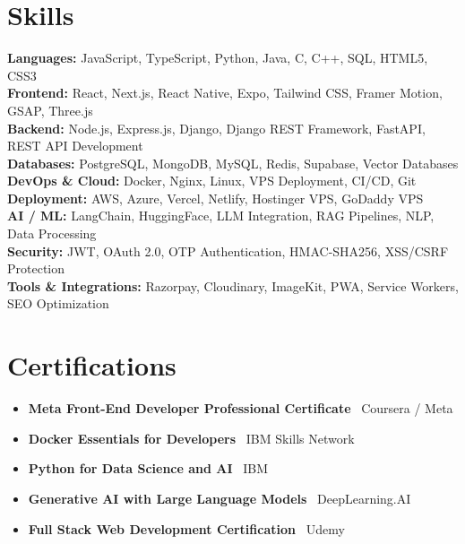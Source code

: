 \documentclass[letterpaper,10pt]{article}
\newcommand{\resumeItem}[1]{
    \item\small{#1 \vspace{-2pt}}
}
\newcommand{\resumeItemListStart}{\begin{itemize}[leftmargin=0.2in]}
\newcommand{\resumeItemListEnd}{\end{itemize}\vspace{-5pt}}
\begin{document}
\section{Skills}

\begin{itemize}[leftmargin=0.15in, label={}]
\small{\item{

\textbf{Languages:} JavaScript, TypeScript, Python, Java, C, C++, SQL, HTML5, CSS3 \\

\textbf{Frontend:} React, Next.js, React Native, Expo, Tailwind CSS, Framer Motion, GSAP, Three.js \\

\textbf{Backend:} Node.js, Express.js, Django, Django REST Framework, FastAPI, REST API Development \\

\textbf{Databases:} PostgreSQL, MongoDB, MySQL, Redis, Supabase, Vector Databases \\

\textbf{DevOps \& Cloud:} Docker, Nginx, Linux, VPS Deployment, CI/CD, Git \\

\textbf{Deployment:} AWS, Azure, Vercel, Netlify, Hostinger VPS, GoDaddy VPS \\

\textbf{AI / ML:} LangChain, HuggingFace, LLM Integration, RAG Pipelines, NLP, Data Processing \\

\textbf{Security:} JWT, OAuth 2.0, OTP Authentication, HMAC-SHA256, XSS/CSRF Protection \\

\textbf{Tools \& Integrations:} Razorpay, Cloudinary, ImageKit, PWA, Service Workers, SEO Optimization

}}
\end{itemize}

\vspace{-4pt}

\section{Certifications}

\resumeItemListStart
    \resumeItem{\textbf{Meta Front-End Developer Professional Certificate} \textemdash\ Coursera / Meta}
    \resumeItem{\textbf{Docker Essentials for Developers} \textemdash\ IBM Skills Network}
    \resumeItem{\textbf{Python for Data Science and AI} \textemdash\ IBM}
    \resumeItem{\textbf{Generative AI with Large Language Models} \textemdash\ DeepLearning.AI}
    \resumeItem{\textbf{Full Stack Web Development Certification} \textemdash\ Udemy}
\resumeItemListEnd
\end{document}
